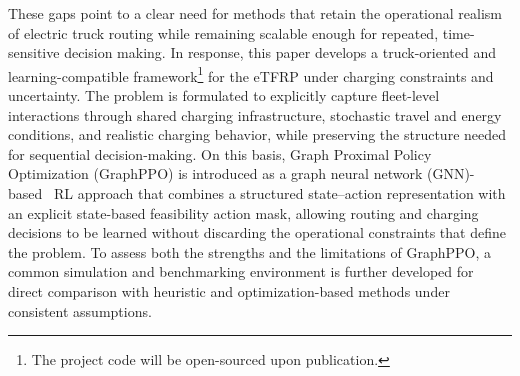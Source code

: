 \documentclass[journal]{IEEEtran}
\begin{document}



These gaps point to a clear need for methods that retain the operational realism of electric truck routing while remaining scalable enough for repeated, time-sensitive decision making. In response, this paper develops a truck-oriented and learning-compatible framework\footnote{The project code will be open-sourced upon publication.}
for the eTFRP under charging constraints and uncertainty. The problem is formulated to explicitly capture fleet-level interactions through shared charging infrastructure, stochastic travel and energy conditions, and realistic charging behavior, while preserving the structure needed for sequential decision-making. On this basis, Graph Proximal Policy Optimization (GraphPPO) is introduced as a graph neural network (GNN)-based~\cite{kipf} RL approach that combines a structured state--action representation with an explicit state-based feasibility action mask, allowing routing and charging decisions to be learned without discarding the operational constraints that define the problem. To assess both the strengths and the limitations of GraphPPO, a common simulation and benchmarking environment is further developed for direct comparison with heuristic and optimization-based methods under consistent assumptions.
\end{document}
